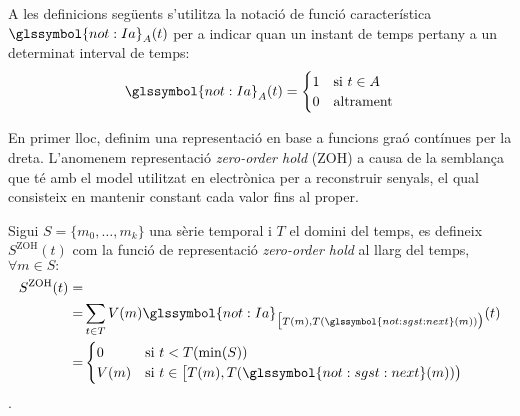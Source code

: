 A les definicions següents s'utilitza la notació de funció
característica $\glssymbol{not:Ia}_A(t)$ per a indicar quan un instant
de temps pertany a un determinat interval de temps:
\[
\glssymbol{not:Ia}_A(t) = 
   \begin{cases}
      1 & \text{si } t\in A \\
      0 & \text{altrament}
    \end{cases}
\]



En primer lloc, definim una representació en base a funcions graó
contínues per la dreta. L'anomenem representació \emph{zero-order
  hold} (ZOH) a causa de la semblança que té amb el model utilitzat en
electrònica per a reconstruir senyals, el qual consisteix en mantenir
constant cada valor fins al proper.
\begin{definition}
  \label{def:sgst:zoh}
  Sigui $S=\{m_0,\ldots,m_k\}$ una sèrie temporal i $T$ el domini del
  temps, es defineix $S^\text{ZOH}(t)$ com la funció de representació
  \emph{zero-order hold} al llarg del temps, $\forall m \in S:$
  \begin{align*}
    S^\text{ZOH}(t) = &  \\
    = & \sum_{t\in T} V(m) \glssymbol{not:Ia}_{\big[T(m), T(\glssymbol{not:sgst:next}(m)) \big)}(t)\\
    = & \begin{cases}
      0 & \text{si }  t<T(\min(S)) \\
      V(m) & \text{si } t\in
      \big[T(m),T(\glssymbol{not:sgst:next}(m))\big)
    \end{cases}
         \end{align*}.
\end{definition}




